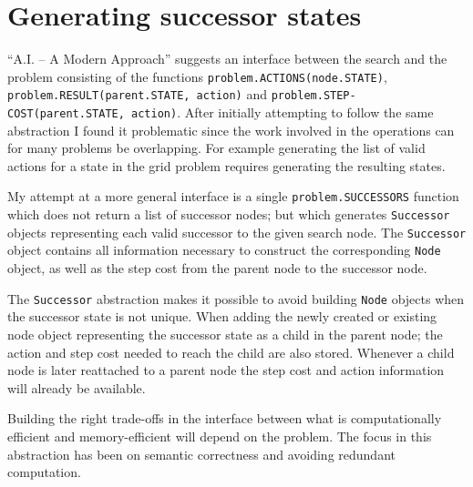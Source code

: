 \section*{Generating successor states}

``A.I. -- A Modern Approach'' suggests an interface between the search and the problem consisting of the functions \texttt{problem.ACTIONS(node.STATE)}, \texttt{problem.RESULT(parent.STATE, action)} and \texttt{problem.STEP-COST(parent.STATE, action)}. After initially attempting to follow the same abstraction I found it problematic since the work involved in the operations can for many problems be overlapping. For example generating the list of valid actions for a state in the grid problem requires generating the resulting states.

My attempt at a more general interface is a single \texttt{problem.SUCCESSORS} function which does not return a list of successor nodes; but which generates \texttt{Successor} objects representing each valid successor to the given search node. The \texttt{Successor} object contains all information necessary to construct the corresponding \texttt{Node} object, as well as the step cost from the parent node to the successor node.

The \texttt{Successor} abstraction makes it possible to avoid building \texttt{Node} objects when the successor state is not unique. When adding the newly created or existing node object representing the successor state as a child in the parent node; the action and step cost needed to reach the child are also stored. Whenever a child node is later reattached to a parent node the step cost and action information will already be available.

Building the right trade-offs in the interface between what is computationally efficient and memory-efficient will depend on the problem. The focus in this abstraction has been on semantic correctness and avoiding redundant computation.



